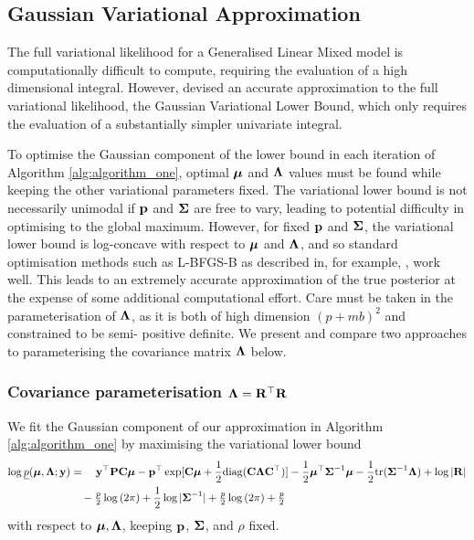 	\subsection{Gaussian Variational Approximation}
			
	The full variational likelihood for a Generalised Linear Mixed model is computationally difficult to
	compute, requiring the evaluation of a high dimensional integral. However, \citep{Ormerod2012} devised
	an accurate approximation to the full variational likelihood, the Gaussian Variational Lower Bound,
	which only requires the evaluation of a substantially simpler univariate integral.
		
	To optimise the Gaussian component of the lower bound in each iteration of Algorithm
	\ref{alg:algorithm_one}, optimal ${\boldsymbol \mu}$ and ${\boldsymbol \Lambda}$ values must be found while keeping the other
	variational parameters fixed. The variational lower bound is not necessarily unimodal if ${\bf p}$ and
	${\boldsymbol \Sigma}$ are free to vary, leading to potential difficulty in optimising to the global maximum.
	However, for fixed ${\bf p}$ and ${\boldsymbol \Sigma}$, the variational lower bound is log-concave with respect to
	${\boldsymbol \mu}$ and ${\boldsymbol \Lambda}$, and so standard optimisation methods such as L-BFGS-B as described in, for
	example, \citep{Liu1989} \citep{Nocedal2006}, work well. This leads to an extremely accurate
	approximation of the true posterior at the expense of some additional computational effort. Care must be
	taken in the parameterisation of ${\boldsymbol \Lambda}$, as it is both of high dimension $(p + mb)^2$ and
	constrained to be semi- positive definite. We present and compare two approaches to parameterising the
	covariance matrix ${\boldsymbol \Lambda}$ below.
		
	\subsubsection{Covariance parameterisation ${\boldsymbol \Lambda} = {\bf R}^\top {\bf R}$}
	
	We fit the Gaussian component of our approximation in Algorithm \ref{alg:algorithm_one} by maximising 
	the variational lower bound	
	\begin{align*}
		\log \underline{p}({\boldsymbol \mu}, {\boldsymbol \Lambda}; {\bf y}) & = \quad {\bf y}^\top{\bf P} {\bf C} {\boldsymbol\mu} - {\bf p}^\top \exp[{\bf C} {\boldsymbol \mu} + \frac{1}{2} \text{diag}({\bf C} {\boldsymbol \Lambda} {\bf C}^\top)] - \frac{1}{2} {\boldsymbol \mu}^\top {\boldsymbol\Sigma}^{-1} {\boldsymbol \mu} - \frac{1}{2} \text{tr}{({\boldsymbol\Sigma}^{-1} {\boldsymbol\Lambda})} + \log{|{\bf R}|} \\
		                                        & \quad - \tfrac{p}{2} \log{(2 \pi)} + \frac{1}{2} \log{|{\boldsymbol\Sigma}^{-1}|} + \tfrac{p}{2} \log{(2 \pi)} + \tfrac{p}{2}                                                                              
	\end{align*}
	\noindent with respect to ${\boldsymbol \mu}, {\boldsymbol \Lambda}$, keeping ${\bf p}$, ${\boldsymbol \Sigma}$, and $\rho$ fixed.
			
